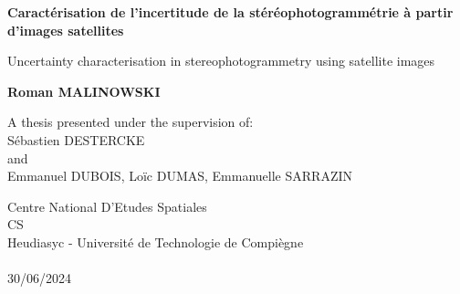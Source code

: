 \begin{titlepage}
    \begin{center}
        \vspace*{1cm}
            
        \Huge
        \textbf{Caractérisation de l'incertitude de la stéréophotogrammétrie à partir d'images satellites}
            
        \vspace{0.5cm}
        \LARGE
        Uncertainty characterisation in stereophotogrammetry using satellite images
            
        \vspace{1.5cm}
        \Large
        \textbf{Roman MALINOWSKI}
        \vspace{0.8cm}
            
        A thesis presented under the supervision of:\\
        Sébastien DESTERCKE\\
        and\\
        Emmanuel DUBOIS, Loïc DUMAS, Emmanuelle SARRAZIN
       
        \vfill
                
        \large
        Centre National D'Etudes Spatiales\\
        CS\\
        Heudiasyc - Université de Technologie de Compiègne\\
        ~\\
        30/06/2024


\end{center}
\end{titlepage}
